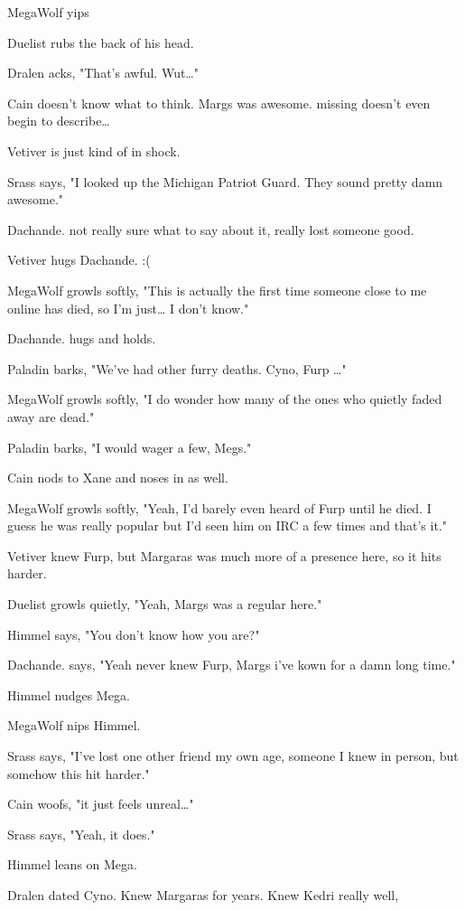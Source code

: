\begin{hangparas}{2em}{1}
MegaWolf yips

Duelist rubs the back of his head.

Dralen acks, "That's awful. Wut\ldots{}"

Cain doesn't know what to think. Margs was awesome. missing doesn't even begin to describe\ldots{}

Vetiver is just kind of in shock.

Srass says, "I looked up the Michigan Patriot Guard.  They sound pretty damn awesome."

Dachande. not really sure what to say about it, really lost someone good.

Vetiver hugs Dachande. :(

MegaWolf growls softly, "This is actually the first time someone close to me online has died, so I'm just\ldots{} I don't know."

Dachande. hugs and holds.

Paladin barks, "We've had other furry deaths. Cyno, Furp \ldots{}"

MegaWolf growls softly, "I do wonder how many of the ones who quietly faded away are dead."

Paladin barks, "I would wager a few, Megs."

Cain nods to Xane and noses in as well.

MegaWolf growls softly, "Yeah, I'd barely even heard of Furp until he died. I guess he was really popular but I'd seen him on IRC a few times and that's it."

Vetiver knew Furp, but Margaras was much more of a presence here, so it hits harder.

Duelist growls quietly, "Yeah, Margs was a regular here."

Himmel says, "You don't know how you are?"

Dachande. says, "Yeah never knew Furp, Margs i've kown for a damn long time."

Himmel nudges Mega.

MegaWolf nips Himmel.

Srass says, "I've lost one other friend my own age, someone I knew in person, but somehow this hit harder."

Cain woofs, "it just feels unreal\ldots{}"

Srass says, "Yeah, it does."

Himmel leans on Mega.

Dralen dated Cyno. Knew Margaras for years. Knew Kedri really well,


\end{hangparas}
